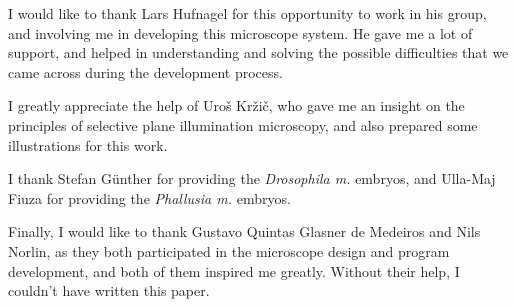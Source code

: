 \documentclass{tdk_style}
\begin{document}
\newpage
\cleardoublepage
{}
\begin{acknowledgements}

I would like to thank Lars Hufnagel for this opportunity to work in his group, and involving me in developing this microscope system. He gave me a lot of support, and helped in understanding and solving the possible difficulties that we came across during the development process.

I greatly appreciate the help of Uroš Kržič, who gave me an insight on the principles of selective plane illumination microscopy, and also prepared some illustrations for this work.

I thank Stefan Günther for providing the \textit{Drosophila m.} embryos, and \mbox{Ulla-Maj} Fiuza for providing the \textit{Phallusia m.} embryos.

Finally, I would like to thank Gustavo Quintas Glasner de Medeiros and Nils Norlin, as they both participated in the microscope design and program development, and both of them inspired me greatly. Without their help, I couldn't have written this paper.

\end{acknowledgements}

\cleardoublepage
{}
{}

{ \footnotesize }
\end{document}
